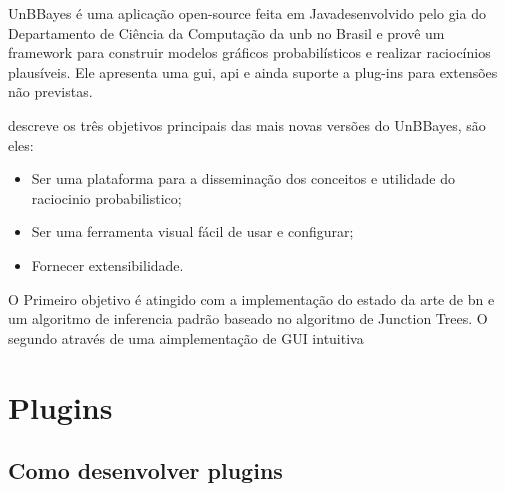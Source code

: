 UnBBayes é uma aplicação open-source feita em Java\texttrademark desenvolvido pelo \gls{gia} do Departamento de Ciência da Computação da \gls{unb} no Brasil e provê um framework para construir modelos gráficos probabilísticos e realizar raciocínios plausíveis. Ele apresenta uma \gls{gui}, \gls{api} e ainda suporte a plug-ins para extensões não previstas.

\cite{livro_do shou} descreve os três objetivos principais das mais novas versões do UnBBayes, são eles:
\begin{itemize}
	\item Ser uma plataforma para a disseminação dos conceitos e utilidade do raciocinio probabilistico;
	\item Ser uma ferramenta visual fácil de usar e configurar;
	\item Fornecer extensibilidade.
\end{itemize}
O Primeiro objetivo é atingido com a implementação do estado da arte de \gls{bn} e um algoritmo de inferencia padrão baseado no algoritmo de Junction Trees. O segundo através de uma aimplementação de GUI intuitiva 

\section{Plugins}

\subsection{Como desenvolver plugins}